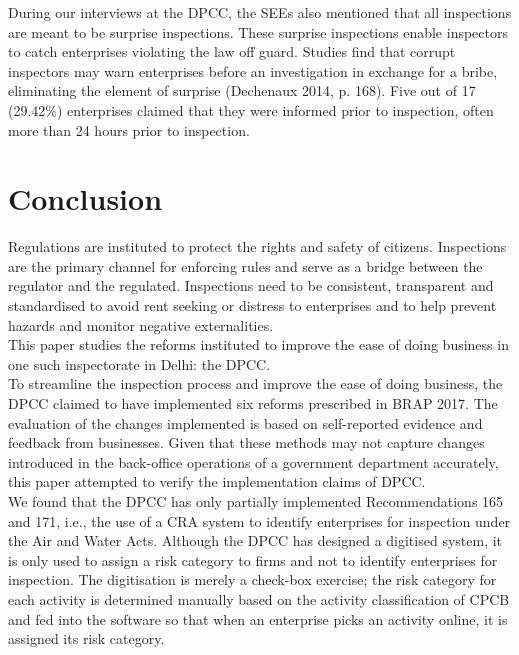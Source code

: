 \documentclass[a4paper, 12pt]{article}
\begin{document}
	
	During our interviews at the DPCC, the SEEs also mentioned that all inspections are meant to be surprise inspections. These surprise inspections enable inspectors to catch enterprises violating the law off guard. Studies find that corrupt inspectors may warn enterprises before an investigation in exchange for a bribe, eliminating the element of surprise (Dechenaux 2014, p. 168). Five out of 17 (29.42\%) enterprises claimed that they were informed prior to inspection, often more than 24 hours prior to inspection. \\
	
	\section{Conclusion}
	
	Regulations are instituted to protect the rights and safety of citizens. Inspections are the primary channel for enforcing rules and serve as a bridge between the regulator and the regulated. Inspections need to be consistent, transparent and standardised to avoid rent seeking or distress to enterprises and to help prevent hazards and monitor negative externalities. \\
	
	This paper studies the reforms instituted to improve the ease of doing business in one such inspectorate in Delhi: the DPCC. \\
	
	To streamline the inspection process and improve the ease of doing business, the DPCC claimed to have implemented six reforms prescribed in BRAP 2017. The evaluation of the changes implemented is based on self-reported evidence and feedback from businesses. Given that these methods may not capture changes introduced in the back-office operations of a government department accurately, this paper attempted to verify the implementation claims of DPCC. \\
	
	We found that the DPCC has only partially implemented Recommendations 165 and 171, i.e., the use of a CRA system to identify enterprises for inspection under the Air and Water Acts. Although the DPCC has designed a digitised system, it is only used to assign a risk category to firms and not to identify enterprises for inspection. The digitisation is merely a check-box exercise; the risk category for each activity is determined manually based on the activity classification of CPCB and fed into the software so that when an enterprise picks an activity online, it is assigned its risk category. \\
	
\end{document}
